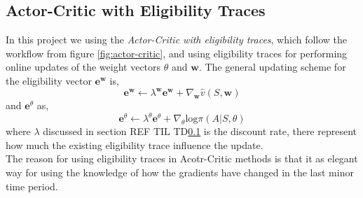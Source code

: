 \documentclass[11pt]{article}
\begin{document}
\subsection{Actor-Critic with Eligibility Traces}

In this project we using the \textit{Actor-Critic with eligibility traces}, which follow the workflow from figure \ref{fig:actor-critic}, and using eligibility traces for performing online updates of the weight vectors $\theta$ and $\mathbf{w}$. The general updating scheme for the eligibility vector $\mathbf{e}^{\mathbf{w}}$ is,
\begin{equation}
    \mathbf{e}^{\mathbf{w}} \leftarrow \lambda^{\mathbf{w}} \mathbf{e}^{\mathbf{w}} + \nabla_{\mathbf{w}} \hat{v}(S, \mathbf{w})
\end{equation}
and $\mathbf{e}^{\theta}$ as,
\begin{equation}
    \mathbf{e}^{\theta} \leftarrow \lambda^{\theta} \mathbf{e}^{\theta} + \nabla_{\theta} \text{log} \pi (A | S, \theta)
\end{equation}
where $\lambda$ discussed in section REF TIL TD\ref{} is the discount rate, there represent how much the existing eligibility trace influence the update.
\\
The reason for using eligibility traces in Acotr-Critic methods is that it as elegant way for using the knowledge of how the gradients have changed in the last minor time period.
\end{document}
